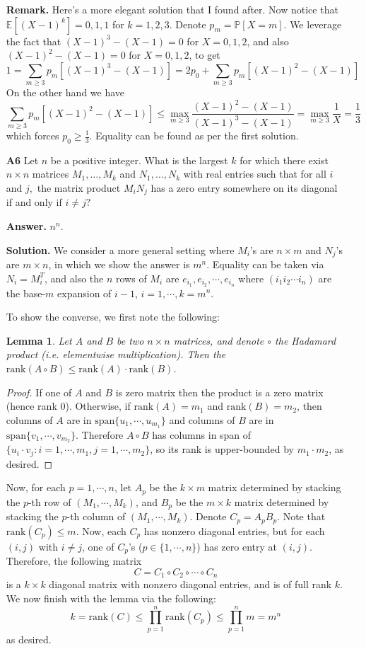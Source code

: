 \documentclass[11pt,a4paper]{article}
\newcommand{\Span}{\mathrm{span}}
\newcommand{\rank}{\mathrm{rank}}
\newcommand{\<}{\langle}
\renewcommand{\>}{\rangle}
\newtheorem{lemma}{Lemma}
\begin{document}
\begin{enumerate}
	
	\textbf{Remark.} Here's a more elegant solution that I found after. Now notice that $\mathbb{E}[(X-1)^k] = 0, 1, 1$ for $k=1, 2, 3$. Denote $p_m = \mathbb{P}[X = m]$. We leverage the fact that $(X-1)^3 - (X-1)=0$ for $X=0, 1, 2$, 
	and also $(X-1)^2 - (X-1)=0$ for $X=0, 1, 2$,
	 to get 
	\[
	1 = \sum_{m\ge 3} p_m[(X-1)^3 - (X-1)] = 2p_0 + \sum_{m\ge 3} p_m[(X-1)^2 - (X-1)] 
	\]
	On the other hand we have 
	\[
	\sum_{m\ge 3} p_m[(X-1)^2 - (X-1)] \le \max_{m\ge 3} \frac{(X-1)^2 - (X-1)}{(X-1)^3 - (X-1)}
	= \max_{m\ge 3}\frac{1}{X} = \frac 13
	\]
	which forces $p_0\ge \frac{1}{3}$. Equality can be found as per the first solution. 
	
	\item[\textbf{A6}] Let $n$ be a positive integer. What is the largest $k$ for which there exist $n\times n$ matrices $M_1,\dots,M_k$ and $N_1,\dots,N_k$ with real entries such that for all $i$ and $j,$ the matrix product $M_iN_j$ has a zero entry somewhere on its diagonal if and only if $i\ne j?$
	
	\textbf{Answer.} $n^n$. 
	
	\textbf{Solution.} We consider a more general setting where $M_i$'s are $n\times m$ and $N_j$'s are $m\times n$, in which we show the answer is $m^n$. Equality can be taken via $N_i = M_i^T$, 
	and also the $n$ rows of $M_i$ are $e_{i_1}, e_{i_2}, \cdots, e_{i_n}$
	where $(i_1i_2\cdots i_n)$ are the base-$m$ expansion of $i - 1$, $i=1, \cdots, k = m^n$. 
	
	To show the converse, we first note the following: 
	\begin{lemma}
		Let $A$ and $B$ be two $n\times n$ matrices, and denote $\circ$ the Hadamard product (i.e. elementwise multiplication). 
		Then the $\rank (A\circ B)\le \rank(A)\cdot \rank(B)$. 
	\end{lemma}
    
    \begin{proof}
    	If one of $A$ and $B$ is zero matrix then the product is a zero matrix (hence rank 0). 
    	Otherwise, if $\rank(A)=m_1$ and $\rank(B)=m_2$, 
    	then columns of $A$ are in $\Span\{u_1, \cdots, u_{m_1}\}$ and columns of $B$ are in $\Span\{v_1, \cdots, v_{m_2}\}$. 
    	Therefore $A\circ B$ has columns in span of $\{u_i\cdot v_j: i=1, \cdots, m_1, j=1, \cdots, m_2\}$, so its rank is upper-bounded by $m_1\cdot m_2$, as desired. 
    \end{proof}
    
    Now, for each $p=1, \cdots, n$, let $A_p$ be the $k\times m$ matrix determined by stacking the $p$-th row of $(M_1, \cdots, M_k)$, 
    and $B_p$ be the $m\times k$ matrix 
    determined by stacking the $p$-th column of $(M_1, \cdots, M_k)$. Denote $C_p=A_pB_p$. 
    Note that $\rank(C_p)\le m$. 
    Now, each $C_p$ has nonzero diagonal entries, but for each $(i, j)$ with $i\neq j$, one of $C_p$'s ($p\in \{1, \cdots, n\}$) has zero entry at $(i, j)$. 
    Therefore, the following matrix 
    \[
    C=C_1\circ C_2 \circ \cdots \circ C_n
    \]
    is a $k\times k$ diagonal matrix with nonzero diagonal entries, and is of full rank $k$. 
    We now finish with the lemma via the following: 
    \[
    k=\rank(C) \le \prod_{p=1}^n \rank(C_p)\le \prod_{p=1}^n m = m^n
    \]
    as desired. 
	

\end{enumerate}
\end{document}

